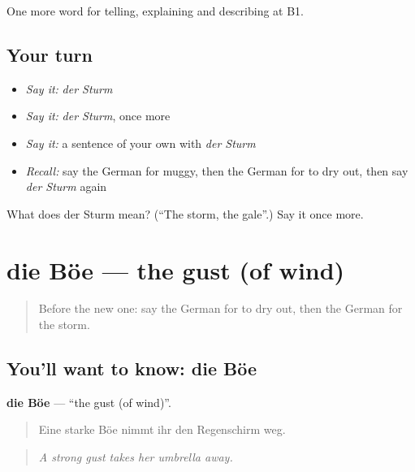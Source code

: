 \begin{grammarlens}[title={What you've built}]
One more word for telling, explaining and describing at B1.
\end{grammarlens}

\subsection*{Your turn}
\begin{itemize}
\raggedright
  \item \emph{Say it:} \emph{der Sturm}
  \item \emph{Say it:} \emph{der Sturm}, once more
  \item \emph{Say it:} a sentence of your own with \emph{der Sturm}
  \item \emph{Recall:} say the German for muggy, then the German for to dry out, then say \emph{der Sturm} again
\end{itemize}

\begin{tcolorbox}[breakable,colback=teal!4,colframe=teal!35!black,title={Before you move on}]
What does der Sturm mean? (\textquotedblleft{}The storm, the gale\textquotedblright{}.) Say it once more.
\end{tcolorbox}
\section[die Böe]{die Böe — the gust (of wind)}

\label{lesson:GE-C465-boee}



\begin{quote}
Before the new one: say the German for to dry out, then the German for the storm.
\end{quote}

\subsection*{You'll want to know: die Böe}
\textbf{die Böe} — \textquotedblleft{}the gust (of wind)\textquotedblright{}.

\begin{quote}
Eine starke Böe nimmt ihr den Regenschirm weg.
\end{quote}

\begin{quote}
\emph{A strong gust takes her umbrella away.}
\end{quote}

